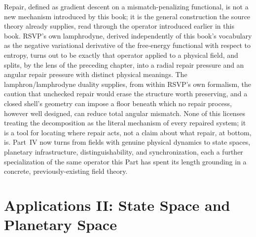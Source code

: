 \documentclass[11pt,fleqn]{book}
\numberwithin{equation}{chapter}
\theoremstyle{plain}
\theoremstyle{definition}
\theoremstyle{remark}
\providecommand{\enquote}[1]{``#1''}
\providecommand{\scollapse}[1]{\operatorname{collapse}_{#1}}
\providecommand{\spop}[1]{\operatorname{pop}(#1)}
\providecommand{\srefuse}[1]{\operatorname{refuse}(#1)}
\providecommand{\sbind}[2]{\operatorname{bind}(#1,#2)}
\providecommand{\Pop}{\mathsf{Pop}}
\begin{document}
Repair, defined as gradient descent on a mismatch-penalizing functional, is not a new mechanism introduced by this book; it is the general construction the source theory already supplies, read through the operator introduced earlier in this book. RSVP's own lamphrodyne, derived independently of this book's vocabulary as the negative variational derivative of the free-energy functional with respect to entropy, turns out to be exactly that operator applied to a physical field, and splits, by the lens of the preceding chapter, into a radial repair pressure and an angular repair pressure with distinct physical meanings. The lamphron/lamphrodyne duality supplies, from within RSVP's own formalism, the caution that unchecked repair would erase the structure worth preserving, and a closed shell's geometry can impose a floor beneath which no repair process, however well designed, can reduce total angular mismatch. None of this licenses treating the decomposition as the literal mechanism of every repaired system; it is a tool for locating where repair acts, not a claim about what repair, at bottom, is. Part~IV now turns from fields with genuine physical dynamics to state spaces, planetary infrastructure, distinguishability, and synchronization, each a further specialization of the same operator this Part has spent its length grounding in a concrete, previously-existing field theory.


\part{Applications II: State Space and Planetary Space}

\providecommand{\scollapse}[1]{\operatorname{collapse}_{#1}}
\providecommand{\spop}[1]{\operatorname{pop}(#1)}
\providecommand{\srefuse}[1]{\operatorname{refuse}(#1)}
\providecommand{\sbind}[2]{\operatorname{bind}(#1,#2)}
\providecommand{\enquote}[1]{``#1''}
\providecommand{\Pop}{\mathsf{Pop}}
\end{document}
